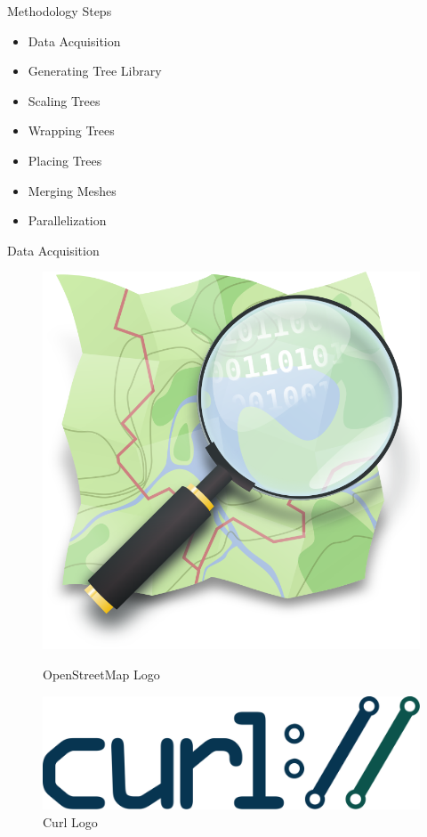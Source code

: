\documentclass[10pt]{beamer}
\begin{document}
\begin{frame}{Methodology Steps}
	\Large
	\begin{itemize}
		\item Data Acquisition
		\item Generating Tree Library
		\item Scaling Trees
		\item Wrapping Trees
		\item Placing Trees
		\item Merging Meshes
		\item Parallelization
	\end{itemize}
\end{frame}

\begin{frame}{Data Acquisition}
	\begin{figure}[h]
		\centering
		\begin{minipage}{0.49\textwidth}
			\centering
			\includegraphics[width=\textwidth]{images/logo-openstreetmap.png}
			\caption{OpenStreetMap Logo}
			\label{fig:figure1}
		\end{minipage}\hfill
		\begin{minipage}{0.49\textwidth}
			\centering
			\includegraphics[width=\textwidth]{images/logo-curl.png}
			\caption{Curl Logo}
			\label{fig:figure2}
		\end{minipage}
	\end{figure}
\end{frame}
\end{document}
